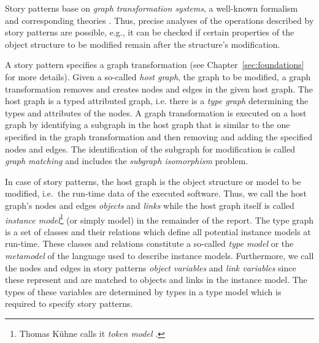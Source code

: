 Story patterns base on \emph{graph transformation systems}, a well-known formalism and corresponding theories \cite{Roz97}.
Thus, precise analyses of the operations described by story patterns are possible,
e.g., it can be checked if certain properties of the object structure to be modified remain after the structure's modification.


A story pattern specifies a graph transformation \cite{Roz97} (see Chapter~\ref{sec:foundations} for more details).
Given a so-called \emph{host graph}, the graph to be modified, a graph transformation removes and creates nodes and edges in the given host graph.
The host graph is a typed attributed graph, i.e. there is a \emph{type graph} determining the types and attributes of the nodes.
A graph transformation is executed on a host graph by identifying a subgraph in the host graph that is similar to the one specified in the graph transformation and then removing and adding the specified nodes and edges.
The identification of the subgraph for modification is called \emph{graph matching} and includes the \emph{subgraph isomorphism} problem.

In case of story patterns, the host graph is the object structure or model to be modified, i.e.\ the run-time data of the executed software.
Thus, we call the host graph's nodes and edges \emph{objects} and \emph{links}
while the host graph itself is called \emph{instance model}\footnote{Thomas K\"{u}hne calls it \emph{token model} \cite{Kue06}.} (or simply model) in the remainder of the report.
The type graph is a set of classes and their relations which define all potential instance models at run-time.
These classes and relations constitute a so-called \emph{type model} or the \emph{metamodel} \cite{Kue06} of the language used to describe instance models.
Furthermore, we call the nodes and edges in story patterns \emph{object variables} and \emph{link variables}
since these represent and are matched to objects and links in the instance model.
The types of these variables are determined by types in a type model which is required to specify story patterns.

